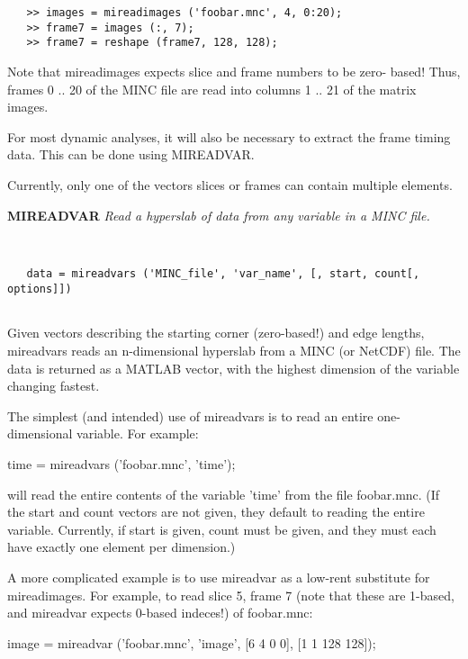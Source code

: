 \begin{verbatim} 
   >> images = mireadimages ('foobar.mnc', 4, 0:20);
   >> frame7 = images (:, 7);
   >> frame7 = reshape (frame7, 128, 128);
\end{verbatim}
 
   Note that mireadimages expects slice and frame numbers to be zero-
   based!  Thus, frames 0 .. 20 of the MINC file are read into columns
   1 .. 21 of the matrix images.
 
   For most dynamic analyses, it will also be necessary to extract
   the frame timing data.  This can be done using MIREADVAR.
 
   Currently, only one of the vectors slices or frames can contain multiple
   elements.
\endfunchelp


{\large\bf MIREADVAR} {\em  Read a hyperslab of data from any variable in a MINC file.}
\begin{verbatim}


   data = mireadvars ('MINC_file', 'var_name', [, start, count[, options]])


\end{verbatim}

   Given vectors describing the starting corner (zero-based!) and edge
   lengths, mireadvars reads an n-dimensional hyperslab from a MINC
   (or NetCDF) file.  The data is returned as a MATLAB vector, with
   the highest dimension of the variable changing fastest.
  
   The simplest (and intended) use of mireadvars is to read an entire
   one-dimensional variable.  For example:
 
     time = mireadvars ('foobar.mnc', 'time');
 
   will read the entire contents of the variable 'time' from the file
   foobar.mnc.  (If the start and count vectors are not given, they
   default to reading the entire variable.  Currently, if start is
   given, count must be given, and they must each have exactly one
   element per dimension.)
 
   A more complicated example is to use mireadvar as a low-rent
   substitute for mireadimages.  For example, to read slice 5, frame 7
   (note that these are 1-based, and mireadvar expects 0-based
   indeces!) of foobar.mnc:
 
     image = mireadvar ('foobar.mnc', 'image', [6 4 0 0], [1 1 128 128]);
 

